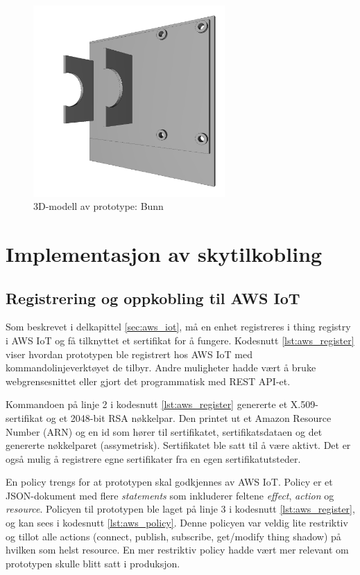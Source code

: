 \begin{figure}
\includegraphics[width=0.65\textwidth, center]{fig/prototype/bunn_fratopp}
\caption{3D-modell av prototype: Bunn}
\label{fig:3dmodell_bunn}
\end{figure}

\section{Implementasjon av skytilkobling}

\subsection{Registrering og oppkobling til AWS IoT}
Som beskrevet i delkapittel \ref{sec:aws_iot}, må en enhet registreres i thing registry i AWS IoT og
få tilknyttet et sertifikat for å fungere. Kodesnutt \ref{lst:aws_register} viser hvordan prototypen ble registrert
hos AWS IoT med kommandolinjeverktøyet de tilbyr. Andre muligheter hadde vært å bruke webgrensesnittet eller
gjort det programmatisk med REST API-et.

Kommandoen på linje 2 i kodesnutt \ref{lst:aws_register} genererte et X.509-sertifikat og et 2048-bit RSA nøkkelpar.
Den printet ut et Amazon Resource Number (ARN) og en id som hører til sertifikatet,
sertifikatsdataen og det genererte nøkkelparet (assymetrisk). Sertifikatet ble satt til å være aktivt.
Det er også mulig å registrere egne sertifikater fra en egen sertifikatutsteder.

En policy trengs for at prototypen skal godkjennes av AWS IoT. Policy er et JSON-dokument med flere
\textit{statements} som inkluderer feltene \textit{effect}, \textit{action} og \textit{resource}.
Policyen til prototypen ble laget på linje 3 i kodesnutt \ref{lst:aws_register}, og kan sees i kodesnutt \ref{lst:aws_policy}.
Denne policyen var veldig lite restriktiv og tillot alle actions (connect, publish, subscribe, get/modify thing shadow) på hvilken
som helst resource. En mer restriktiv policy hadde vært mer relevant om prototypen skulle blitt satt i produksjon.

